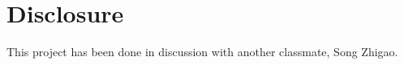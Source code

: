 \documentclass[a4paper,8pt]{article}
\begin{document}
\section{Disclosure}

This project has been done in discussion with another classmate, Song Zhigao.




\end{document}
